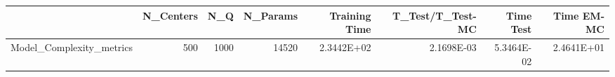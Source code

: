 \begin{tabular}{lrrrrrrr}
\toprule
{} &  N\_Centers &   N\_Q &  N\_Params &  Training Time &  T\_Test/T\_Test-MC &  Time Test &  Time EM-MC \\
\midrule
Model\_Complexity\_metrics &        500 &  1000 &     14520 &     2.3442E+02 &        2.1698E-03 & 5.3464E-02 &  2.4641E+01 \\
\bottomrule
\end{tabular}
